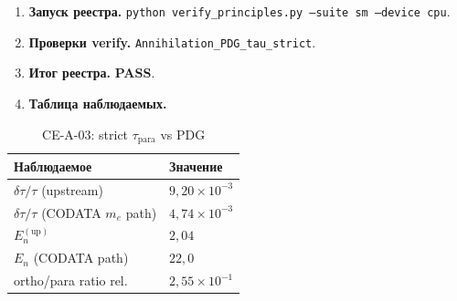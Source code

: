\label{exp:cea03}
\begin{enumerate}[label=\textbf{Шаг \arabic*:},leftmargin=*,itemsep=0.35em]
\item \textbf{Запуск реестра.} \texttt{python verify\_principles.py --suite sm --device cpu}.
\item \textbf{Проверки verify.} \texttt{Annihilation\_PDG\_tau\_strict}.
\item \textbf{Итог реестра.} \textbf{PASS}.
\item \textbf{Таблица наблюдаемых.}
\end{enumerate}
\medskip
\begin{table}[htbp]
\centering
\small
\caption{CE-A-03: strict $\tau_{\mathrm{para}}$ vs PDG}
\label{tab:exp-ce-a-03}
\begin{tabular}{@{}ll@{}}
\toprule
Наблюдаемое & Значение \\
\midrule
$\delta\tau/\tau$ (upstream) & $9{,}20\times 10^{-3}$ \\
$\delta\tau/\tau$ (CODATA $m_e$ path) & $4{,}74\times 10^{-3}$ \\
$E_n^{(\mathrm{up})}$ & $2{,}04$ \\
$E_n$ (CODATA path) & $22{,}0$ \\
ortho/para ratio rel. & $2{,}55\times 10^{-1}$ \\
\bottomrule
\end{tabular}
\end{table}
